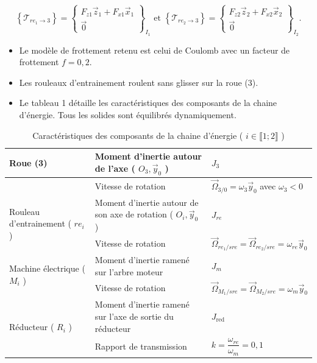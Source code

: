 $$
\left\{\mathcal{T}_{r e_{1} \rightarrow 3}\right\}=\left\{\begin{array}{c}
F_{z 1} \vec{z}_{1}+F_{x 1} \vec{x}_{1} \\
\overrightarrow{0}
\end{array}\right\}_{I_{1}} \text { et }\left\{\mathcal{T}_{r e_{2} \rightarrow 3}\right\}=\left\{\begin{array}{c}
F_{z 2} \vec{z}_{2}+F_{x 2} \vec{x}_{2} \\
\overrightarrow{0}
\end{array}\right\}_{I_{2}} .
$$

\begin{itemize}
  \item Le modèle de frottement retenu est celui de Coulomb avec un facteur de frottement $f=0,2$.
  \item Les rouleaux d'entrainement roulent sans glisser sur la roue (3).
  \item Le tableau 1 détaille les caractéristiques des composants de la chaine d'énergie. Tous les solides sont équilibrés dynamiquement.
\end{itemize}

\begin{table}[h]
\begin{center}
\begin{tabular}{|l|l|l|}
\hline
\multirow{2}{*}{Roue (3)} & Moment d'inertie autour de l'axe ( $O_{3}, \vec{y}_{0}$ ) & $J_{3}$ \\
\hline
 & Vitesse de rotation & $\vec{\Omega}_{3 / 0}=\omega_{3} \vec{y}_{0}$ avec $\omega_{3}<0$ \\
\hline
\multirow{2}{*}{Rouleau d'entrainement ( $r e_{i}$ )} & Moment d'inertie autour de son axe de rotation ( $O_{i}, \vec{y}_{0}$ ) & $J_{r e}$ \\
\hline
 & Vitesse de rotation & $\vec{\Omega}_{r e_{1} / s r e}=\vec{\Omega}_{r e_{2} / s r e}=\omega_{r e} \vec{y}_{0}$ \\
\hline
\multirow{2}{*}{Machine électrique ( $M_{i}$ )} & Moment d'inertie ramené sur l'arbre moteur & $J_{m}$ \\
\hline
 & Vitesse de rotation & $\vec{\Omega}_{M_{1} / s r e}=\vec{\Omega}_{M_{2} / s r e}=\omega_{m} \vec{y}_{0}$ \\
\hline
\multirow{2}{*}{Réducteur ( $R_{i}$ )} & Moment d'inertie ramené sur l'axe de sortie du réducteur & $J_{\text {red }}$ \\
\hline
 & Rapport de transmission & $k=\dfrac{\omega_{r e}}{\omega_{m}}=0,1$ \\
\hline
\end{tabular}
\caption{\label{ccs_psi_2018_tab_01}Caractéristiques des composants de la chaine d'énergie ( $i \in \llbracket 1 ; 2 \rrbracket$ )}
\end{center}
\end{table}

